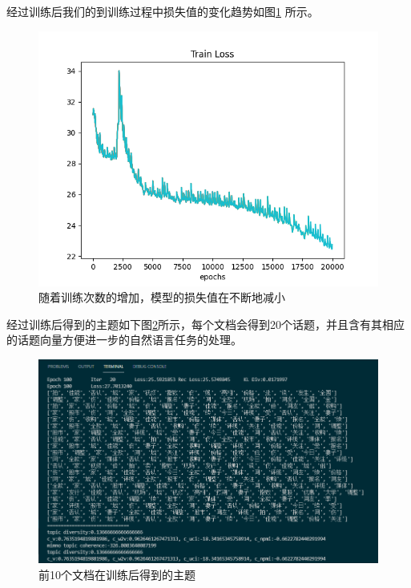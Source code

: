 \documentclass[twocolumn]{article}
\begin{document}
	经过训练后我们的到训练过程中损失值的变化趋势如图\ref{fig:004} 所示。
\begin{figure}
	\centering
	\includegraphics[width=0.9\linewidth]{figures/004.png}
	\caption{{\small 随着训练次数的增加，模型的损失值在不断地减小}}
	\label{fig:004}
\end{figure}

	经过训练后得到的主题如下图\ref{fig:005}所示，每个文档会得到20个话题，并且含有其相应的话题向量方便进一步的自然语言任务的处理。
\begin{figure}
	\centering
	\includegraphics[width=0.9\linewidth]{figures/006.png}
	\caption{{\small 前10个文档在训练后得到的主题}}
	\label{fig:005}
\end{figure}
	
\end{document}
